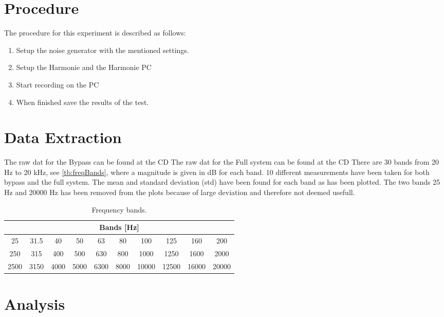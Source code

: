 \section{Procedure}
The procedure for this experiment is described as follows:
\vspace{-5mm}
\begin{enumerate}
\item Setup the noise generator with the mentioned settings.
\item Setup the Harmonie and the Harmonie PC
\item Start recording on the PC
\item When finished save the results of the test.
\end{enumerate}

\section{Data Extraction}
The raw dat for the Bypass can be found at the CD 
The raw dat for the Full system can be found at the CD 
There are 30 bands from 20 Hz to 20 kHz, see \autoref{tb:freqBands}, where a magnitude is given in dB for each band. 10 different measurements have been taken for both bypass and the full system. The mean and standard deviation (std) have been found for each band as has been plotted. The two bands 25 Hz and 20000 Hz has been removed from the plots because of large deviation and therefore not deemed usefull.

\begin{table}[H]
\centering
\begin{tabular}{|c|c|c|c|c|c|c|c|c|c|}
\hline
\multicolumn{10}{|c|}{Bands [Hz]}                                       \\ \hline
25   & 31.5 & 40   & 50   & 63   & 80   & 100   & 125   & 160   & 200   \\ \hline
250  & 315  & 400  & 500  & 630  & 800  & 1000  & 1250  & 1600  & 2000  \\ \hline
2500 & 3150 & 4000 & 5000 & 6300 & 8000 & 10000 & 12500 & 16000 & 20000 \\ \hline
\end{tabular}
\caption{Frequency bands.}
\label{tb:freqBands}
\end{table}

\section{Analysis}


